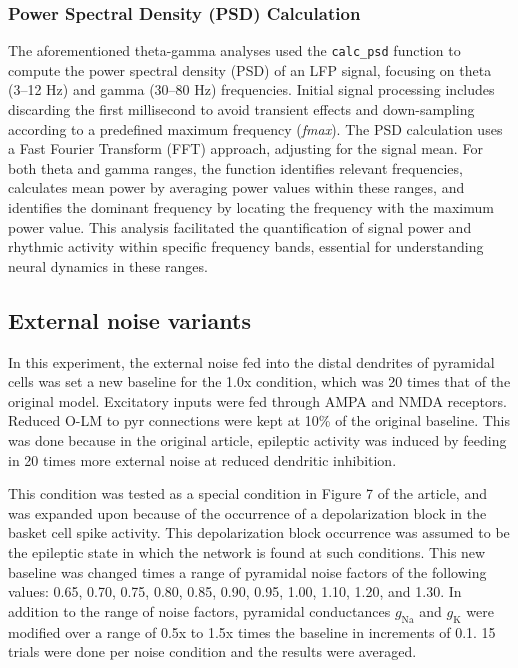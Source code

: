 \subsubsection{Power Spectral Density (PSD) Calculation}
The aforementioned theta-gamma analyses used the \lstinline{calc_psd} function to compute the power spectral density (PSD) of an LFP signal, focusing on theta (3--12 Hz) and gamma (30--80 Hz) frequencies.
Initial signal processing includes discarding the first millisecond to avoid transient effects and down-sampling according to a predefined maximum frequency (\textit{fmax}).
The PSD calculation uses a Fast Fourier Transform (FFT) approach, adjusting for the signal mean.
For both theta and gamma ranges, the function identifies relevant frequencies, calculates mean power by averaging power values within these ranges, and identifies the dominant frequency by locating the frequency with the maximum power value.
This analysis facilitated the quantification of signal power and rhythmic activity within specific frequency bands, essential for understanding neural dynamics in these ranges.

\subsection{External noise variants}
In this experiment, the external noise fed into the distal dendrites of
pyramidal cells was set a new baseline for the 1.0x condition, which was 20 times that of the original
\textcite{sanjayImpairedDendriticInhibition2015} model. Excitatory inputs were fed through
AMPA and NMDA receptors. Reduced O-LM to pyr connections were kept at 10\% of
the original baseline. This was done because in the original article, epileptic activity was induced by feeding in 20 times
more external noise at reduced dendritic inhibition.

This condition was tested as a special condition in Figure 7 of the article,
and was expanded upon because of the occurrence of a depolarization block in
the basket cell spike activity. This depolarization block occurrence was
assumed to be the epileptic state in which the network is found at such
conditions. This new baseline was changed times a range of pyramidal noise
factors of the following values: 0.65, 0.70, 0.75, 0.80, 0.85, 0.90, 0.95,
1.00, 1.10, 1.20, and 1.30. In addition to the range of noise factors,
pyramidal conductances \(g_{\text{Na}}\) and \(g_{\text{K}}\) were modified
over a range of 0.5x to 1.5x times the baseline in increments of 0.1. 15 trials
were done per noise condition and the results were averaged.

